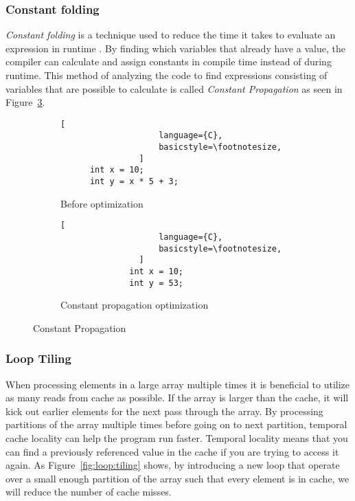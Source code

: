 \subsubsection{Constant folding}
\emph{Constant folding} is a technique used to reduce the time it takes to evaluate an expression in runtime \cite[p.~329]{muchnick1997advanced}. By finding which variables that already have a value, the compiler can calculate and assign constants in compile time instead of during runtime. This method of analyzing the code to find expressions consisting of variables that are possible to calculate is called \emph{Constant Propagation} as seen in Figure~\ref{fig:constant:propagation}.

\ifrelease
\begin{figure}[h]
    \centering
    \begin{adjustbox}{minipage=\linewidth,scale=1.0}
        \begin{subfigure}{.40\textwidth}
            \centering
            \begin{lstlisting}[
                    language={C},
                    basicstyle=\footnotesize,
                ]
      int x = 10;
      int y = x * 5 + 3;
                \end{lstlisting}
            \caption{Before optimization}
            \label{fig:propagation:sub1}
        \end{subfigure}%
        \begin{subfigure}{.50\textwidth}
            \centering
            \begin{lstlisting}[
                    language={C},
                    basicstyle=\footnotesize,
                ]
              int x = 10;
              int y = 53;
                \end{lstlisting}
            \caption{Constant propagation optimization}
            \label{fig:propagation:sub2}
        \end{subfigure}
    \end{adjustbox}
    \caption{Constant Propagation}
    \label{fig:constant:propagation}
\end{figure}
\fi

\subsubsection{Loop Tiling}
When processing elements in a large array multiple times it is beneficial to utilize as many reads from cache as possible. If the array is larger than the cache, it will kick out earlier elements for the next pass through the array. By processing partitions of the array multiple times before going on to next partition, temporal cache locality can help the program run faster. Temporal locality means that you can find a previously referenced value in the cache if you are trying to access it again. As Figure~\ref{fig:loop:tiling} shows, by introducing a new loop that operate over a small enough partition of the array such that every element is in cache, we will reduce the number of cache misses.

